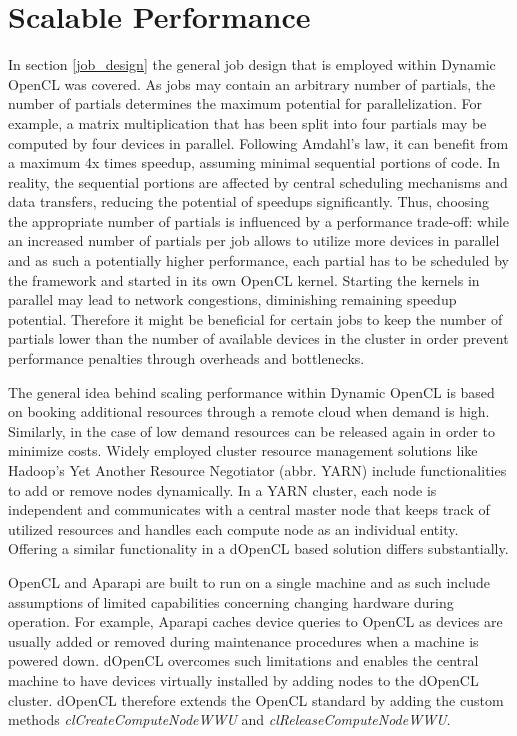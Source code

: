 \section{Scalable Performance}
\label{scalable_performance}
In section \ref{job_design} the general job design that is employed within Dynamic OpenCL was covered. As jobs may contain an arbitrary number of partials, the number of partials determines the maximum potential for parallelization. For example, a matrix multiplication that has been split into four partials may be computed by four devices in parallel. Following Amdahl's law, it can benefit from a maximum 4x times speedup\cite{amdahl}, assuming minimal sequential portions of code. In reality, the sequential portions are affected by central scheduling mechanisms and data transfers, reducing the potential of speedups significantly. Thus, choosing the appropriate number of partials is influenced by a performance trade-off: while an increased number of partials per job allows to utilize more devices in parallel and as such a potentially higher performance, each partial has to be scheduled by the framework and started in its own OpenCL kernel. Starting the kernels in parallel may lead to network congestions, diminishing remaining speedup potential. Therefore it might be beneficial for certain jobs to keep the number of partials lower than the number of available devices in the cluster in order prevent performance penalties through overheads and bottlenecks.

The general idea behind scaling performance within Dynamic OpenCL is based on booking additional resources through a remote cloud when demand is high. Similarly, in the case of low demand resources can be released again in order to minimize costs. Widely employed cluster resource management solutions like Hadoop's Yet Another Resource Negotiator (abbr. YARN) include functionalities to add or remove nodes dynamically. In a YARN cluster, each node is independent and communicates with a central master node that keeps track of utilized resources and handles each compute node as an individual entity. Offering a similar functionality in a dOpenCL based solution differs substantially.

OpenCL and Aparapi are built to run on a single machine and as such include assumptions of limited capabilities concerning changing hardware during operation. For example, Aparapi caches device queries to OpenCL as devices are usually added or removed during maintenance procedures when a machine is powered down. dOpenCL overcomes such limitations and enables the central machine to have devices virtually installed by adding nodes to the dOpenCL cluster. dOpenCL therefore extends the OpenCL standard by adding the custom methods \textit{clCreateComputeNodeWWU} and \textit{clReleaseComputeNodeWWU}.

